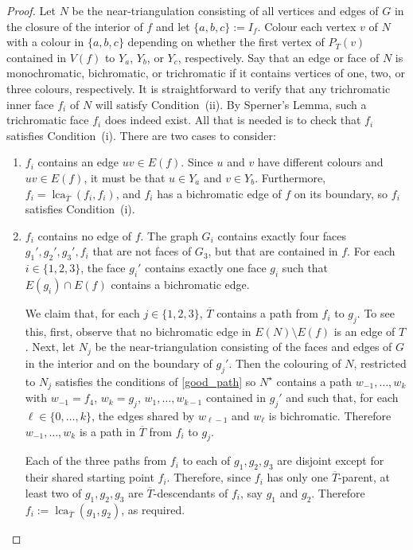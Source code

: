 \documentclass{patmorin}
\DeclareMathOperator{\lca}{lca}
\begin{document}
\begin{proof}
  Let $N$ be the near-triangulation consisting of all vertices and edges of $G$ in the closure of the interior of $f$ and let $\{a,b,c\}:=I_f$.  Colour each vertex $v$ of $N$ with a colour in $\{a,b,c\}$ depending on whether the first vertex of $P_{T}(v)$ contained in $V(f)$ to $Y_a$, $Y_b$, or $Y_c$, respectively.  Say that an edge or face of $N$ is monochromatic, bichromatic, or trichromatic if it contains vertices of one, two, or three colours, respectively.  It is straightforward to verify that any trichromatic inner face $f_i$ of $N$ will satisfy Condition~(ii). By Sperner's Lemma, such a trichromatic face $f_i$ does indeed exist. All that is needed is to check that $f_i$ satisfies Condition~(i).  There are two cases to consider:
  \begin{enumerate}
    \item $f_i$ contains an edge $uv\in E(f)$.  Since $u$ and $v$ have different colours and $uv\in E(f)$, it must be that $u\in Y_a$ and $v\in Y_b$.  Furthermore, $f_i=\lca_{\overline{T}}(f_i,f_i)$, and $f_i$ has a bichromatic edge of $f$ on its boundary, so $f_i$ satisfies Condition~(i).

    \item $f_i$ contains no edge of $f$.  The graph $G_i$ contains exactly four faces $g_1',g_2',g_3',f_i$ that are not faces of $G_3$, but that are contained in $f$. For each $i\in\{1,2,3\}$, the face $g_i'$ contains exactly one face $g_i$ such that $E(g_i)\cap E(f)$ contains a bichromatic edge.

    We claim that, for each $j\in\{1,2,3\}$, $\overline{T}$ contains a path from $f_i$ to $g_j$.  To see this, first, observe that no bichromatic edge in $E(N)\setminus E(f)$ is an edge of $T$.  Next, let $N_j$ be the near-triangulation consisting of the faces and edges of $G$ in the interior and on the boundary of $g_j'$.  Then the colouring of $N$, restricted to $N_j$ satisfies the conditions of \cref{good_path} so $N^\star$ contains a path $w_{-1},\ldots,w_{k}$ with $w_{-1}=f_4$, $w_{k}=g_j$, $w_1,\ldots,w_{k-1}$ contained in $g_j'$ and such that, for each $\ell\in\{0,\ldots,k\}$, the edges shared by $w_{\ell-1}$ and $w_\ell$ is bichromatic.  Therefore $w_{-1},\ldots,w_k$ is a path in $\overline{T}$ from $f_i$ to $g_j$.

    Each of the three paths from $f_i$ to each of $g_1,g_2,g_3$ are disjoint except for their shared starting point $f_i$.  Therefore, since $f_i$ has only one $\overline{T}$-parent, at least two of $g_1,g_2,g_3$ are $\overline{T}$-descendants of $f_i$, say $g_1$ and $g_2$.  Therefore $f_i:=\lca_{\overline{T}}(g_1,g_2)$, as required.
  \end{enumerate}
\end{proof}
\end{document}
